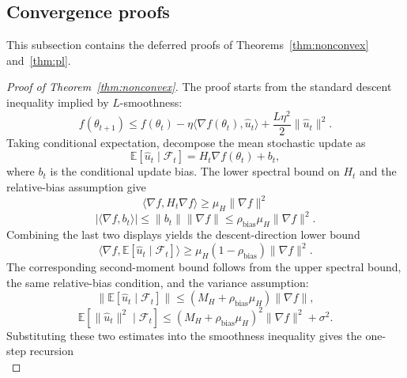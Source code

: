 \documentclass{article}
\newcommand{\E}{\mathbb{E}}
\begin{document}
\subsection{Convergence proofs}
\label{app:convergence-proofs}

This subsection contains the deferred proofs of Theorems~\ref{thm:nonconvex} and~\ref{thm:pl}.

\begin{proof}[Proof of Theorem~\ref{thm:nonconvex}]
The proof starts from the standard descent inequality implied by $L$-smoothness:
\begin{equation}
    f(\theta_{t+1})
    \le
    f(\theta_t)
    -
    \eta\langle \nabla f(\theta_t),\hat u_t\rangle
    +
    \frac{L\eta^2}{2}\|\hat u_t\|^2.
\end{equation}
Taking conditional expectation, decompose the mean stochastic update as
\begin{equation}
    \E[\hat u_t\mid\mathcal F_t]
    =
    H_t\nabla f(\theta_t)+b_t,
\end{equation}
where $b_t$ is the conditional update bias. The lower spectral bound on $H_t$ and the relative-bias assumption give
\begin{equation}
    \langle \nabla f,H_t\nabla f\rangle
    \ge
    \mu_H\|\nabla f\|^2
\end{equation}
\begin{equation}
    |\langle \nabla f,b_t\rangle|
    \le
    \|b_t\|\|\nabla f\|
    \le
    \rho_{\mathrm{bias}}\mu_H\|\nabla f\|^2.
\end{equation}
Combining the last two displays yields the descent-direction lower bound
\begin{equation}
    \langle \nabla f,\E[\hat u_t\mid\mathcal F_t]\rangle
    \ge
    \mu_H(1-\rho_{\mathrm{bias}})\|\nabla f\|^2.
\end{equation}
The corresponding second-moment bound follows from the upper spectral bound, the same relative-bias condition, and the variance assumption:
\begin{equation}
    \|\E[\hat u_t\mid\mathcal F_t]\|
    \le
    (M_H+\rho_{\mathrm{bias}}\mu_H)\|\nabla f\|,
\end{equation}
\begin{equation}
    \E[\|\hat u_t\|^2\mid\mathcal F_t]
    \le
    (M_H+\rho_{\mathrm{bias}}\mu_H)^2\|\nabla f\|^2+\sigma^2.
\end{equation}
Substituting these two estimates into the smoothness inequality gives the one-step recursion
\begin{equation}

\end{equation}
\end{proof}
\end{document}
